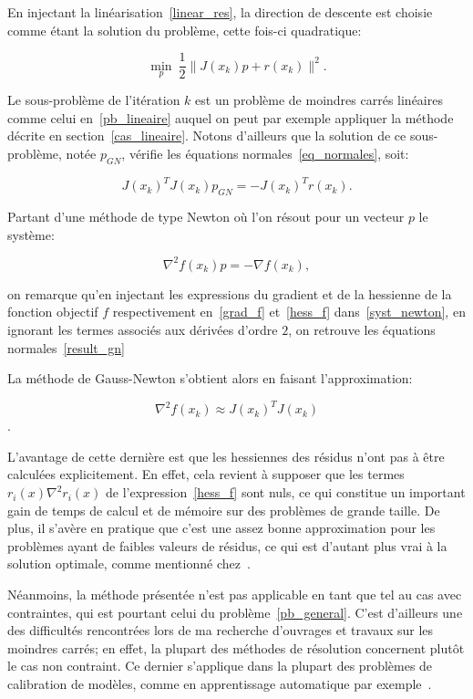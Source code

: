 En injectant la linéarisation~\eqref{linear_res}, la direction de descente est choisie comme étant la solution du problème, cette fois-ci quadratique:

\begin{equation}\label{sous_pb_linearise}
\underset{p}{\min}\ \dfrac{1}{2}\|J(x_k)p + r(x_k)\|^2.
\end{equation}

Le sous-problème de l'itération $k$ est un problème de moindres carrés linéaires comme celui en~\eqref{pb_lineaire} auquel on peut par exemple appliquer la méthode 
décrite en section~\ref{cas_lineaire}. Notons d'ailleurs que la solution de ce sous-problème, notée $p_{GN}$, vérifie les équations normales~\eqref{eq_normales}, 
soit:

\begin{equation}\label{result_gn}
J(x_k)^TJ(x_k)p_{GN}=-J(x_k)^Tr(x_k).
\end{equation}


Partant d'une méthode de type Newton où l'on résout pour un vecteur $p$ le système:

\begin{equation}\label{syst_newton}
  \nabla^2f(x_k)p=-\nabla f(x_k),
\end{equation}



on remarque qu'en injectant les expressions du gradient et de la hessienne de la fonction objectif $f$ respectivement en~\eqref{grad_f} 
et~\eqref{hess_f} dans~\eqref{syst_newton}, en ignorant les termes associés aux dérivées d'ordre $2$, on retrouve les équations normales~\eqref{result_gn}

La méthode de Gauss-Newton s'obtient alors en faisant l'approximation:

\[ \nabla^2f(x_k) \approx J(x_k)^TJ(x_k)\].


L'avantage de cette dernière est que les hessiennes des résidus n'ont pas à être calculées explicitement. 
En effet, cela revient à supposer que les termes $r_i(x)\nabla^2r_i(x)$ de l'expression~\eqref{hess_f} sont nuls, ce qui constitue un important gain de temps de 
calcul et de mémoire sur des problèmes de grande taille. 
De plus, il s'avère en pratique que c'est une assez bonne approximation pour les problèmes ayant de faibles valeurs de résidus, ce qui est d'autant plus vrai à la 
solution optimale, comme mentionné chez~\citet{nocewrig99}.

Néanmoins, la méthode présentée n'est pas applicable en tant que tel au cas avec contraintes, qui est pourtant celui du problème~\eqref{pb_general}. 
C'est d'ailleurs une des difficultés rencontrées lors de ma recherche d'ouvrages et travaux sur les moindres carrés; en effet, la plupart des méthodes de 
résolution concernent plutôt le cas non contraint. Ce dernier s'applique dans la plupart des problèmes de calibration de modèles, comme en apprentissage 
automatique par exemple~\citet{audicatoni11}. 

